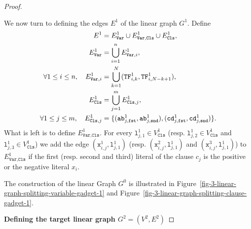 \begin{proof}
\begin{mdframed}
    We now turn to defining the edges $E^{1}$ of the linear graph $G^{1}$.
    Define
    \begin{align*}
      E^{1} &= E^{1}_{\texttt{Var}} \cup E^{1}_{\texttt{Var},\texttt{Cls}} \cup E^{1}_{\texttt{Cls}},
      \\
      E^{1}_{\texttt{Var}} &= \bigcup_{i=1}^{n} E^{1}_{\texttt{Var}, i},
      \\
      \forall 1\leq i \leq n,\quad
      E^{1}_{\texttt{Var}, i} &= \bigcup_{k=1}^{N} (\texttt{TF}^{1}_{i,k}, \texttt{TF}^{1}_{i,N-k+1}),
      \\
      E^{1}_{\texttt{Cls}} &= \bigcup_{j=1}^{m} E^{1}_{\texttt{Cls}, j},
      \\
      \forall 1\leq j \leq m,\quad
      E^{1}_{\texttt{Cls}, j} &=
      \{
      (\texttt{ab}^{1}_{j,\texttt{fst}}, \texttt{ab}^{1}_{j,\texttt{snd}}),
      (\texttt{cd}^{1}_{j,\texttt{fst}}, \texttt{cd}^{1}_{j,\texttt{snd}})
      \}\text{.}
    \end{align*}
    What is left is to define $E^{1}_{\texttt{Var},\texttt{Cls}}$.
    For every $\texttt{l}^{1}_{j, 1} \in V^{1}_{\texttt{Cls}}$
    (resp. $\texttt{l}^{1}_{j, 2} \in V^{1}_{\texttt{Cls}}$ and
    $\texttt{l}^{1}_{j, 3} \in V^{1}_{\texttt{Cls}}$)
    we add
    the edge $(\texttt{x}^{1}_{i,j}, \texttt{l}^{1}_{j, 1})$
    (resp. $(\texttt{x}^{2}_{i,j}, \texttt{l}^{1}_{j, 1})$ and
    $(\texttt{x}^{3}_{i,j}, \texttt{l}^{1}_{j, 1})$)
    to $E^{1}_{\texttt{Var},\texttt{Cls}}$
    if the first (resp. second and third) literal of the clause $c_{j}$
    is the positive or the negative literal $x_{i}$.
  \end{mdframed}

  The construction of the linear Graph $G^{0}$ is illustrated
  in Figure~\ref{fig-3-linear-graph-splitting-variable-gadget-1} and
  Figure~\ref{fig-3-linear-graph-splitting-clause-gadget-1}.

  

  

  \medskip
  \textbf{Defining the target linear graph $G^{2} = (V^{2}, E^{2})$}
  \medskip


\end{proof}
